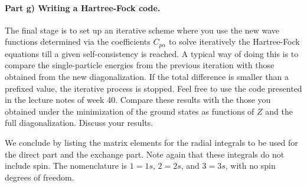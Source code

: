\documentclass[a4,10pt]{article}
\begin{document}
\paragraph{Part g) Writing a Hartree-Fock code.}
The final stage is to set up an iterative scheme where you use the new
wave functions determined via the coefficients $C_{p\alpha}$ to solve
iteratively the Hartree-Fock equations till a given self-consistency
is reached. A typical way of doing this is to compare the
single-particle energies from the previous iteration with those
obtained from the new diagonalization. If the total difference is
smaller than a prefixed value, the iterative process is stopped.
Feel free to use the code presented in the lecture notes of week 40.
Compare these results with the those you obtained under the
minimization of the ground states as functions of $Z$ and the full
diagonalization. Discuss your results.

We conclude by listing the matrix elements for the radial integrals to
be used for the direct part and the exchange part. Note again that
these integrals do not include spin. The nomenclature is $1=1s$,
$2=2s$, and $3=3s$, with no spin degrees of freedom.
\end{document}
